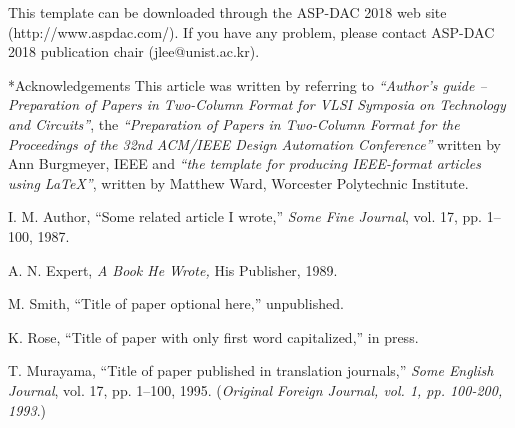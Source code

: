\documentclass[twocolumn]{article}
\makeatletter
\def\section{\@startsection {section}{1}{\z@}{20pt plus 2pt minus 2pt}
{8pt plus 2pt minus 2pt}{\centering\normalsize\sc
\edef\@svsec{\thesection.\ }}}
\def\thesection{\Roman{section}}
\makeatother
\begin{document}
This template can be downloaded through the ASP-DAC 2018 web site
(http://www.aspdac.com/). If you have any problem, please contact ASP-DAC
2018 publication chair (jlee@unist.ac.kr).

\section*{\sc Acknowledgements}
This article was written by referring to {\em ``Author's guide --
Preparation of Papers in Two-Column Format for VLSI Symposia on
Technology and Circuits''}, the {\em ``Preparation of Papers in
Two-Column Format for the Proceedings of the 32nd ACM/IEEE Design
Automation Conference''} written by Ann Burgmeyer, IEEE and {\em ``the
template for producing IEEE-format articles using \LaTeX''}, written by
Matthew Ward, Worcester Polytechnic Institute.

\begin{thebibliography}{9}
\footnotesize
{}
I. M. Author,
``Some related article I wrote,''
{\em Some Fine Journal}, vol. 17, pp. 1--100, 1987.

A. N. Expert,
{\em A Book He Wrote,}
His Publisher, 1989.

M. Smith,
``Title of paper optional here,''
unpublished.

K. Rose,
``Title of paper with only first word capitalized,''	%
in press.

T. Murayama,
``Title of paper published in translation journals,''	%
{\em Some English Journal}, vol. 17, pp. 1--100, 1995.	%
({\em Original Foreign Journal, vol. 1, pp. 100-200, 1993}.)	%

\end{thebibliography}
\end{document}
